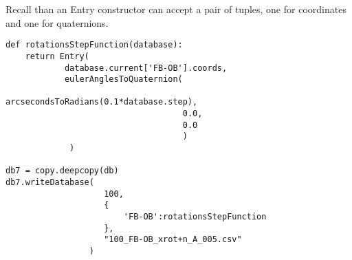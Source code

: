 Recall than an Entry constructor can accept a pair of tuples, one for 
coordinates and one for quaternions. 
\begin{verbatim}
def rotationsStepFunction(database):
    return Entry(
            database.current['FB-OB'].coords,
            eulerAnglesToQuaternion(
                                    arcsecondsToRadians(0.1*database.step),
                                    0.0,
                                    0.0
                                    )
             )

db7 = copy.deepcopy(db)
db7.writeDatabase(
                    100, 
                    {
                        'FB-OB':rotationsStepFunction
                    }, 
                    "100_FB-OB_xrot+n_A_005.csv"
                 )
\end{verbatim}


